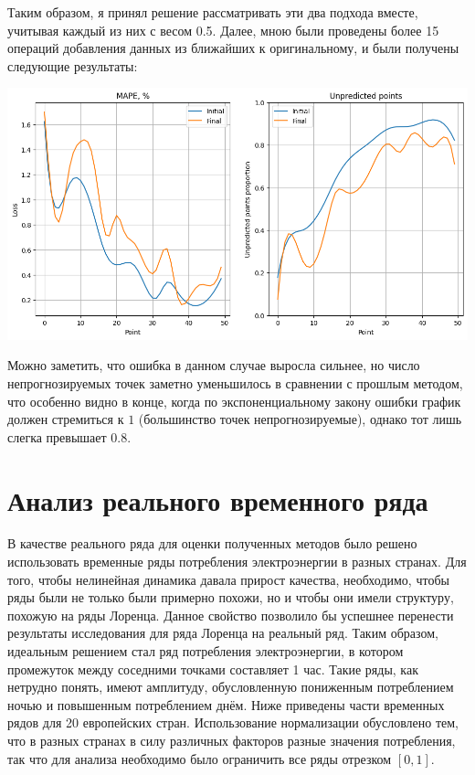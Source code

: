 \documentclass[a4paper, 12pt]{extarticle}
\begin{document}
Таким образом, я принял решение рассматривать эти два подхода вместе, учитывая каждый из них с весом 0.5. Далее, мною были проведены более 15 операций добавления данных из ближайших к оригинальному, и были получены следующие результаты:

\begin{center}
    \includegraphics[width=\textwidth]{img/ord_str.png}
\end{center}

Можно заметить, что ошибка в данном случае выросла сильнее, но число непрогнозируемых точек заметно уменьшилось в сравнении с прошлым методом, что особенно видно в конце, когда по экспоненциальному закону ошибки график должен стремиться к $1$ (большинство точек непрогнозируемые), однако тот лишь слегка превышает $0.8$.

\section{Анализ реального временного ряда}

В качестве реального ряда для оценки полученных методов было решено использовать временные ряды потребления электроэнергии в разных странах. Для того, чтобы нелинейная динамика давала прирост качества, необходимо, чтобы ряды были не только были примерно похожи, но и чтобы они имели структуру, похожую на ряды Лоренца. Данное свойство позволило бы успешнее перенести результаты исследования для ряда Лоренца на реальный ряд. Таким образом, идеальным решением стал ряд потребления электроэнергии, в котором промежуток между соседними точками составляет 1 час. Такие ряды, как нетрудно понять, имеют амплитуду, обусловленную пониженным потреблением ночью и повышенным потреблением днём. Ниже приведены части временных рядов для 20 европейских стран. Использование нормализации обусловлено тем, что в разных странах в силу различных факторов разные значения потребления, так что для анализа необходимо было ограничить все ряды отрезком $[0,1]$.
\end{document}

